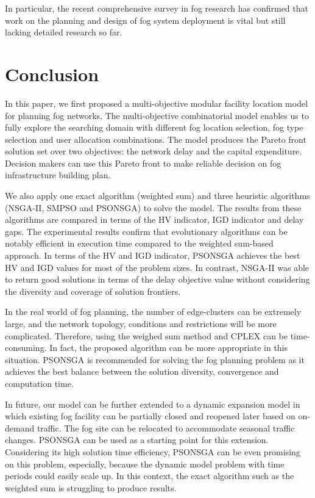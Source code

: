 \documentclass[10pt,journal,compsoc]{IEEEtran}
\begin{document}

In particular, the recent comprehensive survey \cite{mouradian2017comprehensive} in fog research has confirmed that work on the planning and design of fog system deployment is vital but still lacking detailed research so far.

\section{Conclusion}\label{conclu}
In this paper, we first proposed a multi-objective modular facility location model for planning fog networks. The multi-objective combinatorial model enables us to fully explore the searching domain with different fog location selection, fog type selection and user allocation combinations. The model produces the Pareto front solution set over two objectives: the network delay and the capital expenditure. Decision makers can use this Pareto front to make reliable decision on fog infrastructure building plan. 

We also apply one exact algorithm (weighted sum) and three heuristic algorithms (NSGA-II, SMPSO and PSONSGA) to solve the model. The results from these algorithms are compared in terms of the HV indicator, IGD indicator and delay gaps. The experimental results confirm that evolutionary algorithms can be notably efficient in execution time compared to the weighted sum-based approach. In terms of the HV and IGD indicator, PSONSGA achieves the best HV and IGD values for most of the problem sizes. In contrast, NSGA-II was able to return good solutions in terms of the delay objective value without considering the diversity and coverage of solution frontiers.

In the real world of fog planning, the number of edge-clusters can be extremely large, and the network topology, conditions and restrictions will be more complicated. Therefore, using the weighed sum method and CPLEX can be time-consuming. In fact, the proposed algorithm can be more appropriate in this situation. PSONSGA is recommended for solving the fog planning problem as it achieves the best balance between the solution diversity, convergence and computation time.

In future, our model can be further extended to a dynamic expansion model in which existing fog facility can be partially closed and reopened later based on on-demand traffic. The fog site can be relocated to accommodate seasonal traffic changes. PSONSGA can be used as a starting point for this extension. Considering its high solution time efficiency, PSONSGA can be even promising on this problem, especially, because the dynamic model problem with time periods could easily scale up. In this context, the exact algorithm such as the weighted sum is struggling to produce results.
\end{document}
